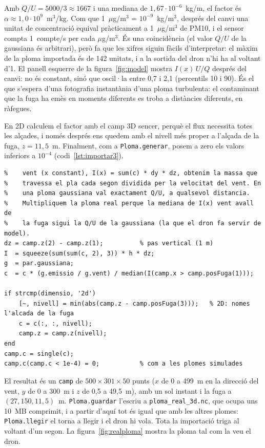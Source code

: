 \documentclass[11pt,a4paper]{article}
\begin{document}
Amb $Q/U = 5000/3 \approx 1667$ i una mediana de $1{,}67 \cdot 10^{-6}$~kg/m, el factor és $\alpha \approx 1{,}0 \cdot 10^9$~m$^3$/kg. Com que 1~$\mu$g/m$^3$ = $10^{-9}$~kg/m$^3$, després del canvi una unitat de concentració equival pràcticament a 1~$\mu$g/m$^3$ de PM10, i el sensor compta 1~compte/s per cada $\mu$g/m$^3$. És una coincidència (el valor $Q/U$ de la gaussiana és arbitrari), però fa que les xifres siguin fàcils d'interpretar: el màxim de la ploma importada és de 142 unitats, i a la sortida del dron n'hi ha al voltant d'1. El panell esquerre de la figura~\ref{fig:model} mostra $I(x)\,U/Q$ després del canvi: no és constant, sinó que oscil·la entre 0,7 i 2,1 (percentils 10 i 90). És el que s'espera d'una fotografia instantània d'una ploma turbulenta: el contaminant que la fuga ha emès en moments diferents es troba a distàncies diferents, en ràfegues.

En 2D calculem el factor amb el camp 3D sencer, perquè el flux necessita totes les alçades, i només després ens quedem amb el nivell més proper a l'alçada de la fuga, $z = 11{,}5$~m. Finalment, com a \texttt{Ploma.generar}, posem a zero els valors inferiors a $10^{-4}$ (codi~\ref{lst:importar3}).

\begin{lstlisting}[caption={Pas 4 de \texttt{Ploma.importarPalm}: unitats, 2D i resultat.}, label=lst:importar3]
% 4. Unitats. Si sumem la concentracio de tot un pla perpendicular al
%    vent (x constant), I(x) = sum(c) * dy * dz, obtenim la massa que
%    travessa el pla cada segon dividida per la velocitat del vent. En
%    una ploma gaussiana val exactament Q/U, a qualsevol distancia.
%    Multipliquem la ploma real perque la mediana de I(x) vent avall de
%    la fuga sigui la Q/U de la gaussiana (la que el dron fa servir de model).
dz = camp.z(2) - camp.z(1);          % pas vertical (1 m)
I  = squeeze(sum(sum(c, 2), 3)) * h * dz;
g  = par.gaussiana;
c  = c * (g.emissio / g.vent) / median(I(camp.x > camp.posFuga(1)));

if strcmp(dimensio, '2d')
    [~, nivell] = min(abs(camp.z - camp.posFuga(3)));   % 2D: nomes l'alcada de la fuga
    c = c(:, :, nivell);
    camp.z = camp.z(nivell);
end
camp.c = single(c);
camp.c(camp.c < 1e-4) = 0;           % com a les plomes simulades
\end{lstlisting}

El resultat és un \texttt{camp} de $500 \times 301 \times 50$ punts ($x$ de 0 a 499~m en la direcció del vent, $y$ de 0 a 300~m i $z$ de 0,5 a 49,5~m), amb un sol instant i la fuga a $(27, 150, 11{,}5)$~m. \texttt{Ploma.guardar} l'escriu a \texttt{ploma\_real\_3d.nc}, que ocupa uns 10~MB comprimit, i a partir d'aquí tot és igual que amb les altres plomes: \texttt{Ploma.llegir} el torna a llegir i el dron hi vola. Tota la importació triga al voltant d'un segon. La figura~\ref{fig:realploma} mostra la ploma tal com la veu el dron.
\end{document}
